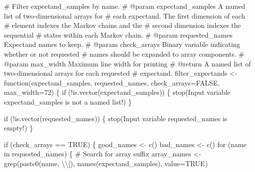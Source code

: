 \documentclass[
  letterpaper,
  DIV=11,
  numbers=noendperiod]{scrartcl}
\newenvironment{Shaded}{\begin{snugshade}}{\end{snugshade}}
\newcommand{\CharTok}[1]{\textcolor[rgb]{0.13,0.47,0.30}{#1}}
\newcommand{\CommentTok}[1]{\textcolor[rgb]{0.37,0.37,0.37}{#1}}
\newcommand{\ControlFlowTok}[1]{\textcolor[rgb]{0.00,0.23,0.31}{#1}}
\newcommand{\DecValTok}[1]{\textcolor[rgb]{0.68,0.00,0.00}{#1}}
\newcommand{\KeywordTok}[1]{\textcolor[rgb]{0.00,0.23,0.31}{#1}}
\newcommand{\NormalTok}[1]{\textcolor[rgb]{0.00,0.23,0.31}{#1}}
\newcommand{\OperatorTok}[1]{\textcolor[rgb]{0.37,0.37,0.37}{#1}}
\newcommand{\StringTok}[1]{\textcolor[rgb]{0.13,0.47,0.30}{#1}}
\begin{document}
\begin{Shaded}
\begin{Highlighting}[]
\CommentTok{\# Filter \textasciigrave{}expectand\_samples\textasciigrave{} by name.}
\CommentTok{\# @param expectand\_samples A named list of two{-}dimensional arrays for}
\CommentTok{\#                          each expectand.  The first dimension of each}
\CommentTok{\#                          element indexes the Markov chains and the}
\CommentTok{\#                          second dimension indexes the sequential}
\CommentTok{\#                          states within each Markov chain.}
\CommentTok{\# @param requested\_names Expectand names to keep.}
\CommentTok{\# @param check\_arrays Binary variable indicating whether or not requested}
\CommentTok{\#                     names should be expanded to array components.}
\CommentTok{\# @param max\_width Maximum line width for printing}
\CommentTok{\# @return A named list of two{-}dimensional arrays for each requested}
\CommentTok{\#         expectand.}
\NormalTok{filter\_expectands }\OperatorTok{\textless{}{-}}\NormalTok{ function(expectand\_samples, requested\_names,}
\NormalTok{                              check\_arrays}\OperatorTok{=}\NormalTok{FALSE, max\_width}\OperatorTok{=}\DecValTok{72}\NormalTok{) \{}
  \ControlFlowTok{if}\NormalTok{ (}\OperatorTok{!}\KeywordTok{is}\NormalTok{.vector(expectand\_samples)) \{}
\NormalTok{    stop(}\StringTok{\textquotesingle{}Input variable \textasciigrave{}expectand\_samples\textasciigrave{} is not a named list!\textquotesingle{}}\NormalTok{)}
\NormalTok{  \}}
  
  \ControlFlowTok{if}\NormalTok{ (}\OperatorTok{!}\KeywordTok{is}\NormalTok{.vector(requested\_names)) \{}
\NormalTok{    stop(}\StringTok{\textquotesingle{}Input variable \textasciigrave{}requested\_names\textasciigrave{} is empty!\textquotesingle{}}\NormalTok{)}
\NormalTok{  \}}
  
  \ControlFlowTok{if}\NormalTok{ (check\_arrays }\OperatorTok{==}\NormalTok{ TRUE) \{}
\NormalTok{    good\_names }\OperatorTok{\textless{}{-}}\NormalTok{ c()}
\NormalTok{    bad\_names }\OperatorTok{\textless{}{-}}\NormalTok{ c()}
    \ControlFlowTok{for}\NormalTok{ (name }\KeywordTok{in}\NormalTok{ requested\_names) \{}
      \CommentTok{\# Search for array suffix}
\NormalTok{      array\_names }\OperatorTok{\textless{}{-}}\NormalTok{ grep(paste0(name, }\StringTok{\textquotesingle{}}\CharTok{\textbackslash{}\textbackslash{}}\StringTok{[\textquotesingle{}}\NormalTok{), }
\NormalTok{                          names(expectand\_samples), }
\NormalTok{                          value}\OperatorTok{=}\NormalTok{TRUE)}
      

\end{Highlighting}
\end{Shaded}
\end{document}
